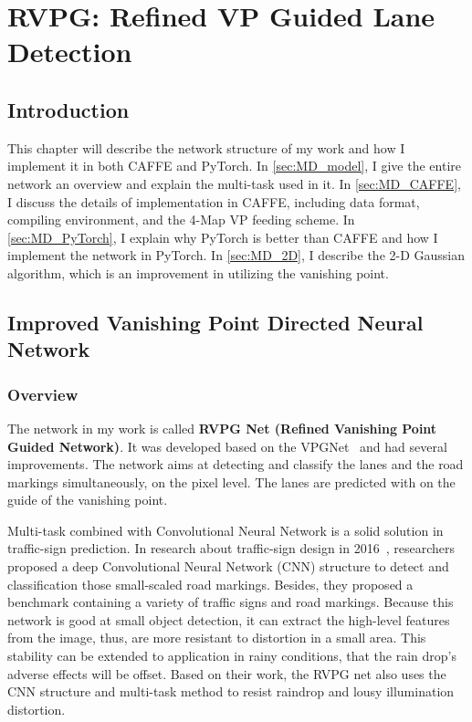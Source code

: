 
\chapter{RVPG: Refined VP Guided Lane Detection}
\label{cha:model}
\begin{spacing}{1.5}
\setlength{\parskip}{0.3in}

\section{Introduction}

This chapter will describe the network structure of my work and how I implement it in both CAFFE and PyTorch. In \autoref{sec:MD_model}, I give the entire network an overview and explain the multi-task used in it. In \autoref{sec:MD_CAFFE}, I discuss the details of implementation in CAFFE, including data format, compiling environment, and the 4-Map VP feeding scheme. In \autoref{sec:MD_PyTorch}, I explain why PyTorch is better than CAFFE and how I implement the network in PyTorch. In \autoref{sec:MD_2D}, I describe the 2-D Gaussian algorithm, which is an improvement in utilizing the vanishing point.

\section{Improved Vanishing Point Directed Neural Network}
\label{sec:MD_model}

\subsection{Overview}
The network in my work is called \textbf{RVPG Net (Refined Vanishing Point Guided Network)}. It was developed based on the VPGNet~\cite{lee2017vpgnet} and had several improvements. The network aims at detecting and classify the lanes and the road markings simultaneously, on the pixel level. The lanes are predicted with on the guide of the vanishing point. 

Multi-task combined with Convolutional Neural Network is a solid solution in traffic-sign prediction. In research about traffic-sign design in 2016~\cite{zhu2016traffic, huval2015empirical}, researchers proposed a deep Convolutional Neural Network (CNN) structure to detect and classification those small-scaled road markings. Besides, they proposed a benchmark containing a variety of traffic signs and road markings. Because this network is good at small object detection, it can extract the high-level features from the image, thus, are more resistant to distortion in a small area. This stability can be extended to application in rainy conditions, that the rain drop's adverse effects will be offset. Based on their work, the RVPG net also uses the CNN structure and multi-task method to resist raindrop and lousy illumination distortion.


\end{spacing}
